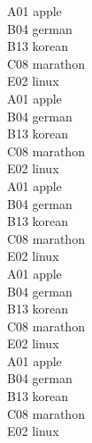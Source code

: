 \documentclass[UTF8]{article}
\begin{document}
\large
\begin{center}
\begin{tcolorbox}[colback=white, colframe=myBlue,title={$\vcenter{\hbox{\texttt{[image: plus.png]}}}$ \textcolor{white}{\bfseries These items are good choices.}}]
\begin{multicols}{4}    %
 A01 apple\\B04 german\\B13 korean\\C08 marathon\\E02 linux\\
 A01 apple\\B04 german\\B13 korean\\C08 marathon\\E02 linux\\
 A01 apple\\B04 german\\B13 korean\\C08 marathon\\E02 linux\\
 A01 apple\\B04 german\\B13 korean\\C08 marathon\\E02 linux\\
 A01 apple\\B04 german\\B13 korean\\C08 marathon\\E02 linux\\
\end{multicols}
\end{tcolorbox}


\end{center}
\end{document}
